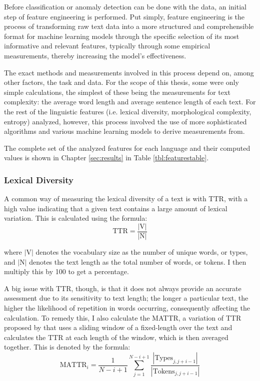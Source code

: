 \documentclass[12pt,a4paper]{article}
\numberwithin{figure}{section}
\numberwithin{table}{section}
\numberwithin{definition}{section}
\begin{document}

Before classification or anomaly detection can be done with the data, an initial step of feature engineering is performed. Put simply, feature engineering is the process of transforming raw text data into a more structured and comprehensible format for machine learning models through the specific selection of its most informative and relevant features, typically through some empirical measurements, thereby increasing the model's effectiveness. 

The exact methods and measurements involved in this process depend on, among other factors, the task and data. For the scope of this thesis, some were only simple calculations, the simplest of these being the measurements for text complexity: the average word length and average sentence length of each text. For the rest of the linguistic features (i.e. lexical diversity, morphological complexity, entropy) analyzed, however, this process involved the use of more sophisticated algorithms and various machine learning models to derive measurements from.

The complete set of the analyzed features for each language and their computed values is shown in Chapter \ref{sec:results} in Table \ref{tbl:featurestable}.

\subsubsection{Lexical Diversity}
\label{ssec:lexicaldiversity}



A common way of measuring the lexical diversity of a text is with TTR, with a high value indicating that a given text contains a large amount of lexical variation. This is calculated using the formula: \[\text{TTR} = \frac{|\text{V}|}{|\text{N}|}\] 

where \( |\text{V}| \) denotes the vocabulary size as the number of unique words, or types, and \( |\text{N}| \) denotes the text length as the total number of words, or tokens. I then multiply this by 100 to get a percentage. 

A big issue with TTR, though, is that it does not always provide an accurate assessment due to its sensitivity to text length; the longer a particular text, the higher the likelihood of repetition in words occurring, consequently affecting the calculation. To remedy this, I also calculate the MATTR, a variation of TTR proposed by \textcite{Covington2010article} that uses a sliding window of a fixed-length over the text and calculates the TTR at each length of the window, which is then averaged together. This is denoted by the formula: \[\text{MATTR}_i = \frac{1}{N - i + 1} \sum_{j=1}^{N-i+1} \frac{|\text{Types}_{j,j+i-1}|}{|\text{Tokens}_{j,j+i-1}|}\]
\end{document}
